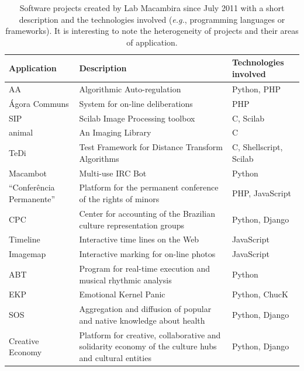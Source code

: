 \documentclass{article}
\newcommand{\eg}{{\it e.g.}}
\begin{document}
\begin{table}
    \caption{Software projects created by Lab Macambira since July
      2011 with a short description and the technologies involved (\eg,
      programming languages or frameworks). It is
      interesting to note the heterogeneity of projects and their areas
      of application.}
    \footnotesize{\begin{tabular}{|l|p{5cm}|l|}
        \hline
        Application & Description & Technologies involved \\ 
        \hline \hline
        AA            & Algorithmic Auto-regulation      & Python, PHP \\
        \hline
        \'{A}gora Communs & System for on-line deliberations & PHP \\
        \hline
        SIP           & Scilab Image Processing toolbox & C, Scilab \\
        \hline
        animal        & An Imaging Library              & C \\
        \hline
        TeDi          & Test Framework for Distance Transform
        Algorithms & C, Shellscript, Scilab \\
        \hline
        Macambot      & Multi-use IRC Bot               & Python \\
        \hline
        ``Confer\^{e}ncia Permanente'' & Platform for the permanent
        conference of the rights of minors & PHP, JavaScript \\
        \hline
        CPC           & Center for accounting of the Brazilian culture
        representation groups & Python, Django \\
        \hline
        Timeline      & Interactive time lines on the Web & JavaScript
        \\
        \hline
        Imagemap      & Interactive marking for on-line photos &
        JavaScript \\
        \hline
        ABT           & Program for real-time execution and musical
        rhythmic analysis & Python \\
        \hline
        EKP           & Emotional Kernel Panic & Python, ChucK \\
        \hline
        SOS           & Aggregation and diffusion of popular and native
        knowledge about health & Python, Django \\
        \hline
        Creative Economy & Platform for creative, collaborative and
        solidarity economy of the culture hubs and cultural entities &
        Python, Django \\

\end{tabular}}
\end{table}
\end{document}
